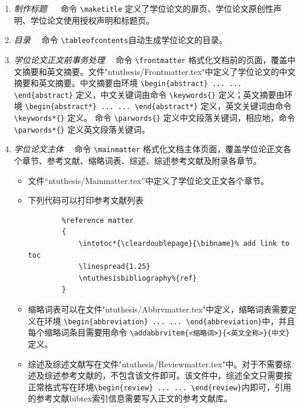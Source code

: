 \begin{enumerate}
\item \emph{制作标题} ~~ 命令 \verb|\maketitle| 定义了学位论文的扉页、学位论文原创性声明、学位论文使用授权声明和标题页。
\item \emph{目录}~~ 命令 \verb|\tableofcontents|自动生成学位论文的目录。
\item \emph{学位论文正文前事务处理}~~ 命令 \verb|\frontmatter| 格式化文档前的页面，覆盖中文摘要和英文摘要。文件"ntuthesis/Frontmatter.tex"中定义了学位论文的中文摘要和英文摘要。中文摘要由环境 \verb|\begin{abstract} ... ... \end{abstract}| 定义，中文关键词由命令 \verb|\keywords{}| 定义；英文摘要由环境 \verb|\begin{abstract*} ... ... \end{abstract*}| 定义，英文关键词由命令 \verb|\keywords*{}| 定义。 命令 \verb|\parwords{}| 定义中文段落关键词，相应地，命令 \verb|\parwords*{}| 定义英文段落关键词。
\item \emph{学位论文主体}~~ 命令 \verb|\mainmatter| 格式化文档主体页面，覆盖学位论正文各个章节、参考文献、缩略词表、综述、综述参考文献及附录各章节。
    \begin{itemize}
    \item 文件“ntuthesis/Mainmatter.tex”中定义了学位论文正文各个章节。
    \item 下列代码可以打印参考文献列表
        \begin{verbatim}
        %reference matter
        {
            \intotoc*{\cleardoublepage}{\bibname}% add link to toc
            \linespread{1.25}
            \ntuthesisbibliography%{ref}
        }
        \end{verbatim}
    \item 缩略词表可以在文件"ntuthesis/Abbrvmatter.tex"中定义，缩略词表需要定义在环境 \verb|\begin{abbreviation} ... ... \end{abbreviation}|中，并且每个缩略词条目需要用命令 \verb|\addabbrvitem{<缩略词>}{<英文全称>}{中文}| 定义。
    \item 综述及综述文献写在文件"ntuthesis/Reviewmatter.tex"中。对于不需要综述及综述参考文献的，不包含该文件即可。该文件中，综述全文只需要按正常格式写在环境\verb|\begin{review} ... ... \end{review}|内即可，引用的参考文献bibtex索引信息需要写入正文的参考文献库。

\end{itemize}
\end{enumerate}
